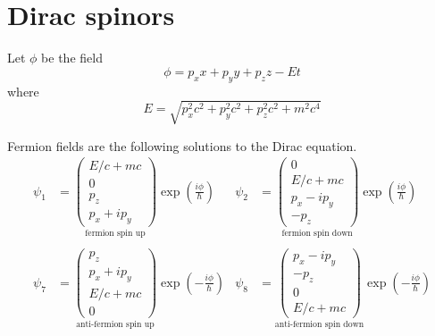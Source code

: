 

\section*{Dirac spinors}

Let $\phi$ be the field
\begin{equation*}
\phi=p_xx+p_yy+p_zz-Et
\end{equation*}
where
\begin{equation*}
E=\sqrt{p_x^2c^2+p_y^2c^2+p_z^2c^2+m^2c^4}
\end{equation*}

Fermion fields are the following solutions to the Dirac equation.
\begin{align*}
\psi_1&=\underset{\text{fermion spin up}}{\begin{pmatrix}E/c+mc\\0\\p_z\\p_x+ip_y\end{pmatrix}}
\exp\left(\frac{i\phi}{\hbar}\right)
& \psi_2&=\underset{\text{fermion spin down}}{\begin{pmatrix}0\\E/c+mc\\p_x-ip_y\\-p_z\end{pmatrix}}
\exp\left(\frac{i\phi}{\hbar}\right)
\\
\\
\psi_7&=\underset{\text{anti-fermion spin up}}{\begin{pmatrix}p_z\\p_x+ip_y\\E/c+mc\\0\end{pmatrix}}
\exp\left(-\frac{i\phi}{\hbar}\right)
& \psi_8&=\underset{\text{anti-fermion spin down}}{\begin{pmatrix}p_x-ip_y\\-p_z\\0\\E/c+mc\end{pmatrix}}
\exp\left(-\frac{i\phi}{\hbar}\right)
\end{align*}

